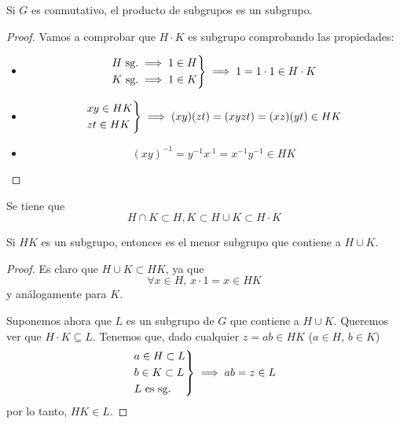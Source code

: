 \begin{obs}
    Si $G$ es conmutativo, el producto de subgrupos es un subgrupo.
\end{obs}

\begin{proof}
    Vamos a comprobar que $H \cdot K$ es subgrupo comprobando las propiedades:
    \begin{itemize}
        \item 
            \[
                \begin{rcases}
                    H \text{ sg.} \implies 1 \in H \\
                    K \text{ sg.} \implies 1 \in K
                \end{rcases}
                \implies 1 = 1\cdot 1 \in H \cdot K
            \]
        \item
            \[
                \begin{rcases}
                    xy \in HK \\
                    zt \in HK
                \end{rcases}
                \implies (xy)(zt) = (xyzt) = (xz)(yt) \in HK
            \]
        \item
            \[
                (xy)^{-1} = y^{-1} x^{.1} = x^{-1}y^{-1} \in HK
            \]
    \end{itemize}
\end{proof}

\begin{obs}
    Se tiene que
    \[
        H \cap K \subset H, K \subset H \cup K \subset H \cdot K
    \]
\end{obs}

\begin{obs}
    Si $HK$ es un subgrupo, entonces es el menor subgrupo que contiene a $H \cup K$. 
\end{obs}

\begin{proof}
    Es claro que $H \cup K \subset HK$, ya que
    \[
        \forall x \in H, \, x\cdot1 = x \in HK
    \]
    y análogamente para $K$.

    Suponemos ahora que $L$ es un subgrupo de $G$ que contiene a $H \cup K$. Queremos ver que
    $ H \cdot K \subseteq L$. Tenemos que, dado cualquier $z = ab \in HK$ ($a \in H$, $b \in K$)
    \[
        \begin{rcases}
            a \in H \subset L \\
            b \in K \subset L \\
            L \text{ es sg.}
        \end{rcases}
        \implies ab = z \in L
    \]
    por lo tanto, $HK \in L$.
\end{proof}

